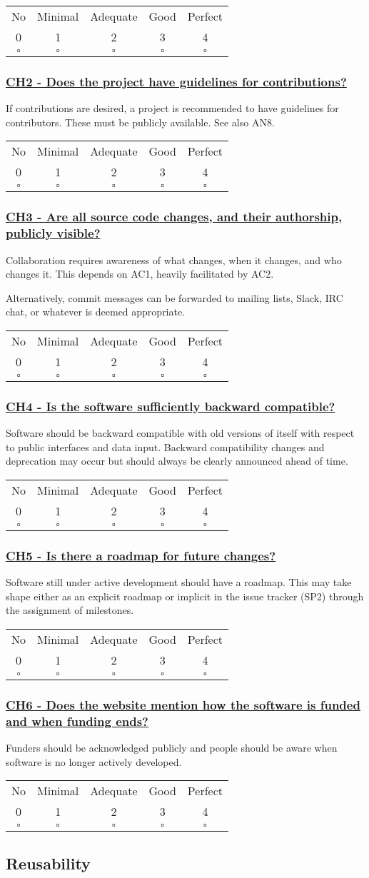 \documentclass[a4paper,11pt]{article}
\newcommand{\criterion}[2]{\subsubsection*{\underline{#1 - #2}}\label{id:#1}}
\newcommand\CheckTable{%
  \begin{tabular}{ccccc}
    No & Minimal & Adequate & Good & Perfect \\
    0 & 1 & 2 & 3 & 4 \\
    \hline
    $\square$ & $\square$ & $\square$ & $\square$ & $\square$ \\
  \end{tabular}%
}
\begin{document}
\CheckTable

\newcommand{\chTwoID}{CH2}
\newcommand{\chTwoText}{Does the project have guidelines for contributions?}
\criterion{\chTwoID}{\chTwoText}

If contributions are desired, a project is recommended to have guidelines for
contributors. These must be publicly available.
See also AN8.

\CheckTable

\newcommand{\chThreeID}{CH3}
\newcommand{\chThreeText}{Are all source code changes, and their authorship, publicly visible?}
\criterion{\chThreeID}{\chThreeText}

Collaboration requires awareness of what changes, when it changes, and who
changes it. This depends on AC1, heavily facilitated by AC2.

Alternatively, commit messages can be forwarded to mailing lists, Slack, IRC chat, or
whatever is deemed appropriate.

\CheckTable

\newcommand{\chFourID}{CH4}
\newcommand{\chFourText}{Is the software sufficiently backward compatible?}
\criterion{\chFourID}{\chFourText}

Software should be backward compatible with old versions of itself with respect
to public interfaces and data input. Backward compatibility changes and
deprecation may occur but should always be clearly announced ahead of time.

\CheckTable

\newcommand{\chFiveID}{CH5}
\newcommand{\chFiveText}{Is there a roadmap for future changes?}
\criterion{\chFiveID}{\chFiveText}

Software still under active development should have a roadmap. This may take
shape either as an explicit roadmap or implicit in the issue tracker
(SP2) through the assignment of milestones.

\CheckTable

\newcommand{\chSixID}{CH6}
\newcommand{\chSixText}{Does the website mention how the software is funded and when funding ends?}
\criterion{\chSixID}{\chSixText}

Funders should be acknowledged publicly and people should be aware when
software is no longer actively developed.

\CheckTable

\subsection{Reusability}\label{sec:reu}
\end{document}
